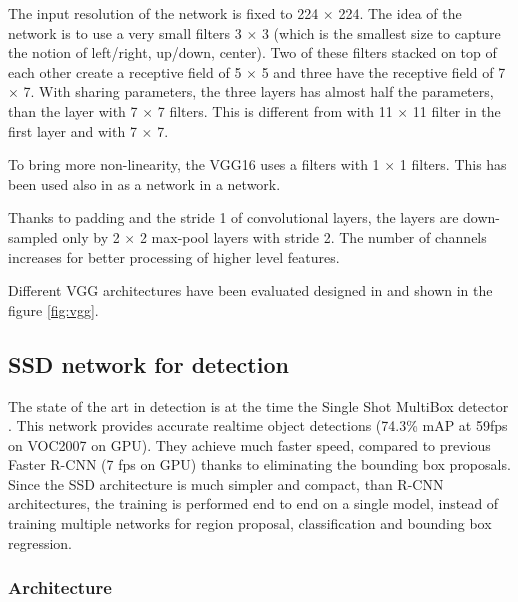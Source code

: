 \documentclass[a4paper,12pt,titlepage]{article}
\numberwithin{figure}{section}
\begin{document}
The input resolution of the network is fixed to 224 $\times$ 224. The idea of the network is to use a very small filters 3 $\times$ 3  (which is the smallest size to capture the notion of left/right, up/down, center)\cite{simonyan2014very}. Two of these filters stacked on top of each other create a receptive field of 5 $\times$ 5 and three have the receptive field of 7 $\times$ 7. With sharing parameters, the three layers has almost half the parameters, than the layer with 7 $\times$ 7 filters. This is different from \cite{krizhevsky2012imagenet} with 11 $\times$ 11 filter in the first layer and \cite{zeiler2014visualizing} with 7 $\times$ 7.

To bring more non-linearity, the VGG16 uses a filters with 1 $\times$ 1 filters. This has been used also in \cite{lecun1989backpropagation} as a network in a network.

Thanks to padding and the stride 1 of convolutional layers, the layers are down-sampled only by 2 $\times$ 2 max-pool layers with stride 2. The number of channels increases for better processing of higher level features. 

Different VGG architectures have been evaluated designed in \cite{simonyan2014very} and shown in the figure \ref{fig:vgg}. 



\subsection{SSD network for detection}
\label{sec:ssd}

The state of the art in detection is at the time the Single Shot MultiBox detector \cite{liu2016ssd}. This network provides accurate realtime object detections (74.3\% mAP at 59fps on VOC2007 on GPU). They achieve much faster speed, compared to previous Faster R-CNN (7 fps on GPU) thanks to eliminating the bounding box proposals. Since the SSD architecture is much simpler and compact, than R-CNN architectures, the training is performed end to end on a single model, instead of training multiple networks for region proposal, classification and bounding box regression.

\subsubsection{Architecture}
\end{document}
